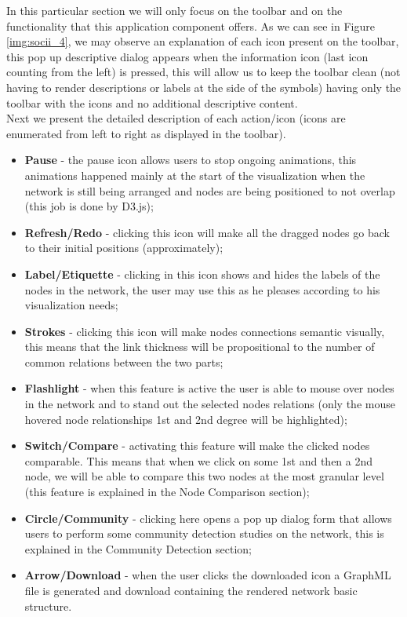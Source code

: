 In this particular section we will only focus on the toolbar and on the functionality that this application component offers. As we can see in Figure \ref{img:socii_4}, we may observe an explanation of each icon present on the toolbar, this pop up descriptive dialog appears when the information icon (last icon counting from the left) is pressed, this will allow us to keep the toolbar clean (not having to render descriptions or labels at the side of the symbols) having only the toolbar with the icons and no additional descriptive content.\\
\indent Next we present the detailed description of each action/icon (icons are enumerated from left to right as displayed in the toolbar).
\begin{itemize}
    \item \textbf{Pause} - the pause icon allows users to stop ongoing animations, this animations happened mainly at the start of the visualization when the network is still being arranged and nodes are being positioned to not overlap (this job is done by D3.js);
    \item \textbf{Refresh/Redo} - clicking this icon will make all the dragged nodes go back to their initial positions (approximately);
    \item \textbf{Label/Etiquette} - clicking in this icon shows and hides the labels of the nodes in the network, the user may use this as he pleases according to his visualization needs;
    \item \textbf{Strokes} - clicking this icon will make nodes connections semantic visually, this means that the link thickness will be propositional to the number of common relations between the two parts;
    \item \textbf{Flashlight} - when this feature is active the user is able to mouse over nodes in the network and to stand out the selected nodes relations (only the mouse hovered node relationships 1st and 2nd degree will be highlighted);
    \item \textbf{Switch/Compare} - activating this feature will make the clicked nodes comparable. This means that when we click on some 1st and then a 2nd node, we will be able to compare this two nodes at the most granular level (this feature is explained in the Node Comparison section);
    \item \textbf{Circle/Community} - clicking here opens a pop up dialog form that allows users to perform some community detection studies on the network, this is explained in the Community Detection section;
    \item \textbf{Arrow/Download} - when the user clicks the downloaded icon a GraphML file is generated and download containing the rendered network basic structure.
\end{itemize}

